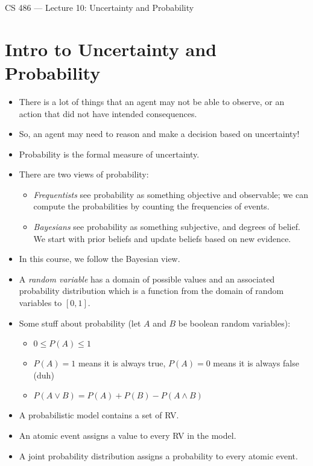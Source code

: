 \documentclass{article}
\author{Clement Tsang}
\begin{document}
\begin{center}
    \Large{CS 486 --- Lecture 10: Uncertainty and Probability}
\end{center}

\section{Intro to Uncertainty and Probability}
\begin{itemize}
    \item There is a lot of things that an agent may not be able to observe, or an action that did not have intended consequences.
    \item So, an agent may need to reason and make a decision based on uncertainty!
    \item Probability is the formal measure of uncertainty.
    \item There are two views of probability:
        \begin{itemize}
            \item \emph{Frequentists} see probability as something objective and observable; we can compute the probabilities by  counting the frequencies of events.
            \item \emph{Bayesians} see probability as something subjective, and degrees of belief.  We start with prior beliefs and update beliefs based on new evidence.
        \end{itemize}
    \item In this course, we follow the Bayesian view.
    \item A \emph{random variable} has a domain of possible values and an associated probability distribution which is a function from the domain of random variables to $[0, 1]$.
    \item Some stuff about probability (let $A$ and $B$ be boolean random variables):
        \begin{itemize}
            \item $0 \leq P(A) \leq 1$
            \item $P(A) = 1$ means it is always true, $P(A) = 0$ means it is always false (duh)
            \item $P(A \vee B) = P(A) + P(B) - P(A \wedge B)$
        \end{itemize}
    \item A probabilistic model contains a set of RV.
    \item An atomic event assigns a value to every RV in the model.
    \item A joint probability distribution assigns a probability to every atomic event.

\end{itemize}
\end{document}
